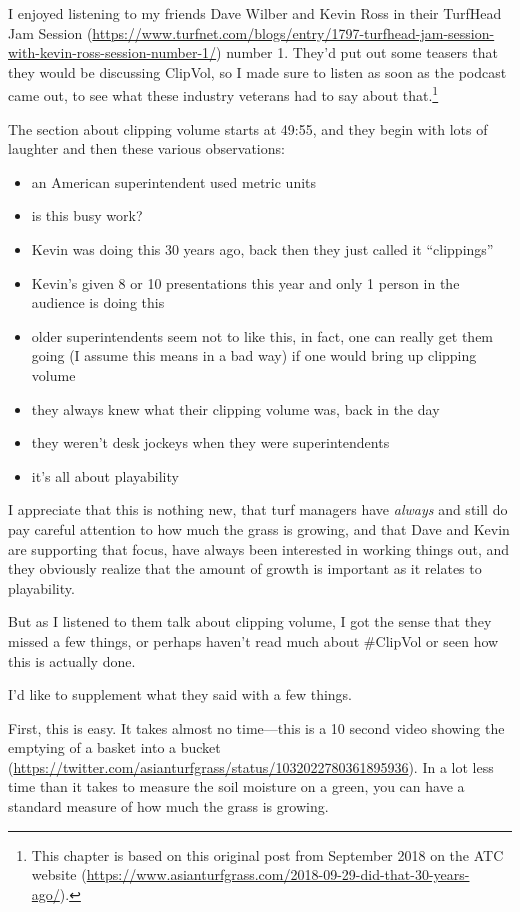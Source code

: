 \documentclass[12pt,b5,]{tufte-book}
\providecommand{\tightlist}{%
  \setlength{\itemsep}{0pt}\setlength{\parskip}{0pt}}
\begin{document}
I enjoyed listening to my friends Dave Wilber and Kevin Ross in their TurfHead Jam Session (\url{https://www.turfnet.com/blogs/entry/1797-turfhead-jam-session-with-kevin-ross-session-number-1/}) number 1. They'd put out some teasers that they would be discussing ClipVol, so I made sure to listen as soon as the podcast came out, to see what these industry veterans had to say about that.\footnote{This chapter is based on this original post from September 2018 on the ATC website (\url{https://www.asianturfgrass.com/2018-09-29-did-that-30-years-ago/}).}

The section about clipping volume starts at 49:55, and they begin with lots of laughter and then these various observations:

\begin{itemize}
\tightlist
\item
  an American superintendent used metric units
\item
  is this busy work?
\item
  Kevin was doing this 30 years ago, back then they just called it ``clippings''
\item
  Kevin's given 8 or 10 presentations this year and only 1 person in the audience is doing this
\item
  older superintendents seem not to like this, in fact, one can really get them going (I assume this means in a bad way) if one would bring up clipping volume
\item
  they always knew what their clipping volume was, back in the day
\item
  they weren't desk jockeys when they were superintendents
\item
  it's all about playability
\end{itemize}

I appreciate that this is nothing new, that turf managers have \emph{always} and still do pay careful attention to how much the grass is growing, and that Dave and Kevin are supporting that focus, have always been interested in working things out, and they obviously realize that the amount of growth is important as it relates to playability.

But as I listened to them talk about clipping volume, I got the sense that they missed a few things, or perhaps haven't read much about \#ClipVol or seen how this is actually done.

I'd like to supplement what they said with a few things.

First, this is easy. It takes almost no time---this is a 10 second video showing the emptying of a basket into a bucket (\url{https://twitter.com/asianturfgrass/status/1032022780361895936}). In a lot less time than it takes to measure the soil moisture on a green, you can have a standard measure of how much the grass is growing.
\end{document}
